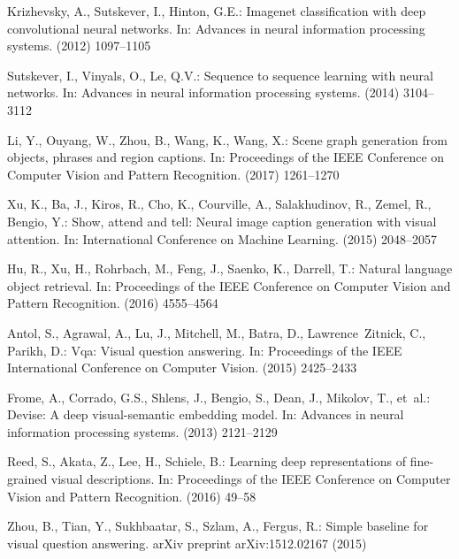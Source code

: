 \documentclass[runningheads]{llncs}
\begin{document}
\begin{thebibliography}{8}

Krizhevsky, A., Sutskever, I., Hinton, G.E.:
\newblock Imagenet classification with deep convolutional neural networks.
\newblock In: Advances in neural information processing systems. (2012)
  1097--1105

Sutskever, I., Vinyals, O., Le, Q.V.:
\newblock Sequence to sequence learning with neural networks.
\newblock In: Advances in neural information processing systems. (2014)
  3104--3112

Li, Y., Ouyang, W., Zhou, B., Wang, K., Wang, X.:
\newblock Scene graph generation from objects, phrases and region captions.
\newblock In: Proceedings of the IEEE Conference on Computer Vision and Pattern
  Recognition. (2017)  1261--1270

Xu, K., Ba, J., Kiros, R., Cho, K., Courville, A., Salakhudinov, R., Zemel, R.,
  Bengio, Y.:
\newblock Show, attend and tell: Neural image caption generation with visual
  attention.
\newblock In: International Conference on Machine Learning. (2015)  2048--2057

Hu, R., Xu, H., Rohrbach, M., Feng, J., Saenko, K., Darrell, T.:
\newblock Natural language object retrieval.
\newblock In: Proceedings of the IEEE Conference on Computer Vision and Pattern
  Recognition. (2016)  4555--4564

Antol, S., Agrawal, A., Lu, J., Mitchell, M., Batra, D., Lawrence~Zitnick, C.,
  Parikh, D.:
\newblock Vqa: Visual question answering.
\newblock In: Proceedings of the IEEE International Conference on Computer
  Vision. (2015)  2425--2433

Frome, A., Corrado, G.S., Shlens, J., Bengio, S., Dean, J., Mikolov, T.,
  et~al.:
\newblock Devise: A deep visual-semantic embedding model.
\newblock In: Advances in neural information processing systems. (2013)
  2121--2129

Reed, S., Akata, Z., Lee, H., Schiele, B.:
\newblock Learning deep representations of fine-grained visual descriptions.
\newblock In: Proceedings of the IEEE Conference on Computer Vision and Pattern
  Recognition. (2016)  49--58

Zhou, B., Tian, Y., Sukhbaatar, S., Szlam, A., Fergus, R.:
\newblock Simple baseline for visual question answering.
\newblock arXiv preprint arXiv:1512.02167 (2015)


\end{thebibliography}
\end{document}
